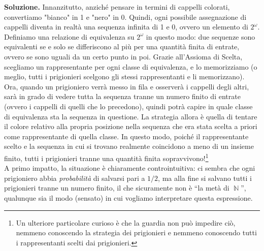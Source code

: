 \documentclass[12pt,a4paper]{report}
\theoremstyle{definition}
\theoremstyle{num.custom-title}
\DeclareMathOperator{\N}{\mathbb{N}}
\begin{document}
\noindent\textbf{Soluzione.} Innanzitutto, anziché pensare in termini di cappelli colorati, convertiamo "bianco" in 1 e "nero" in 0. Quindi, ogni possibile assegnazione di cappelli diventa in realtà una sequenza infinita di 1 e 0, ovvero un elemento di $2^\omega$. Definiamo una relazione di equivalenza su $2^\omega$ in questo modo: due sequenze sono equivalenti se e solo se differiscono al più per una quantità finita di entrate, ovvero se sono uguali da un certo punto in poi. Grazie all'Assioma di Scelta, scegliamo un rappresentante per ogni classe di equivalenza, e lo memorizziamo (o meglio, tutti i prigionieri scelgono gli stessi rappresentanti e li memorizzano). Ora, quando un prigioniero verrà messo in fila e osserverà i cappelli degli altri, sarà in grado di vedere tutta la sequenza tranne un numero finito di entrate (ovvero i cappelli di quelli che lo precedono), quindi potrà capire in quale classe di equivalenza sta la sequenza in questione. La strategia allora è quella di tentare il colore relativo alla propria posizione nella sequenza che era stata scelta a priori come rappresentante di quella classe. In questo modo, poiché il rappresentante scelto e la sequenza in cui si trovano realmente coincidono a meno di un insieme finito, tutti i prigionieri tranne una quantità finita sopravvivono!\footnote{Un ulteriore particolare curioso è che la guardia non può impedire ciò, nemmeno conoscendo la strategia dei prigionieri e nemmeno conoscendo tutti i rappresentanti scelti dai prigionieri.}\\

A primo impatto, la situazione è chiaramente controintuitiva: ci sembra che ogni prigioniero abbia \emph{probabilità} di salvarsi pari a $1/2$, ma alla fine si salvano tutti i prigionieri tranne un numero finito, il che sicuramente non è ``la metà di $\N$'', qualunque sia il modo (sensato) in cui vogliamo interpretare questa espressione.
\end{document}
